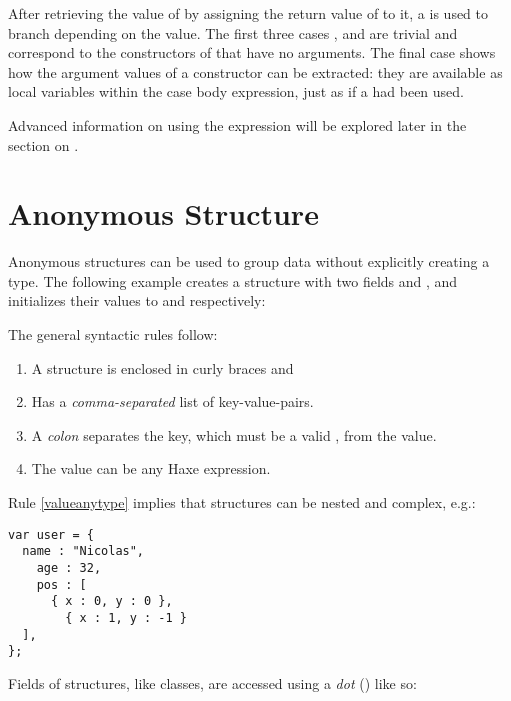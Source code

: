 
After retrieving the value of  by assigning the return value of  to it, a  is used to branch depending on the value. The first three cases ,  and  are trivial and correspond to the constructors of  that have no arguments. The final case  shows how the argument values of a constructor can be extracted: they are available as local variables within the case body expression, just as if a  had been used.

Advanced information on using the  expression will be explored later in the section on .


\section{Anonymous Structure}
\label{types-anonymous-structure}

Anonymous structures can be used to group data without explicitly creating a type. The following example creates a structure with two fields  and , and initializes their values to  and  respectively:

The general syntactic rules follow:

\begin{enumerate}
	\item A structure is enclosed in curly braces \expr{$\left\{\right\}$} and
	\item Has a \emph{comma-separated} list of key-value-pairs.
	\item A \emph{colon} separates the key, which must be a valid , from the value.
	\item\label{valueanytype} The value can be any Haxe expression.
\end{enumerate}
Rule \ref{valueanytype} implies that structures can be nested and complex, e.g.:


\begin{lstlisting}
var user = {
  name : "Nicolas",
	age : 32,
	pos : [
	  { x : 0, y : 0 },
		{ x : 1, y : -1 }
  ],
};
\end{lstlisting}
Fields of structures, like classes, are accessed using a \emph{dot} () like so:

